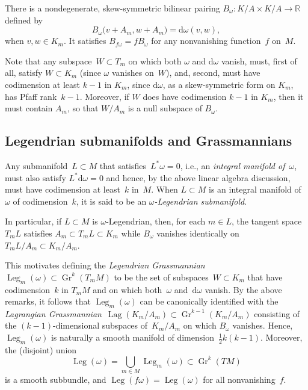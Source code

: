 \documentclass[10pt,a4paper]{amsart}
\renewcommand{\d}{\mathrm{d}}%
\newcommand{\bbR}{{\mathbb R}}
\newcommand{\Gr}{\operatorname{Gr}}
\newcommand{\Leg}{\operatorname{Leg}}
\newcommand{\Lag}{\operatorname{Lag}}
\numberwithin{equation}{section}
\begin{document}
There is a nondegenerate, skew-symmetric bilinear pairing
$B_\omega \colon K{/}A\times K{/}A\to\bbR$
defined by
\[
B_\omega\bigl(v{+}A_m,w{+}A_m\bigr) = \mathrm{d}\omega(v,w),
\]
when $v,w\in K_m$. It satisfies $B_{f\omega} = fB_\omega$
for any nonvanishing function~$f$ on~$M$.

Note that any subspace~$W\subset T_m$ on which both $\omega$ and $\d\omega$
vanish, must, first of all, satisfy $W\subset K_m$
(since $\omega$ vanishes on~$W$), and, second, must have codimension
at least $k{-}1$ in $K_m$, since $\d\omega$, as a skew-symmetric form
on $K_m$, has Pfaff rank~$k{-}1$.
Moreover, if $W$ does have codimension $k{-}1$ in $K_m$,
then it must contain $A_m$, so that $W/A_m$ is a null subspace of $B_\omega$.

\subsection{Legendrian submanifolds and Grassmannians}
Any submanifold~$L\subset M$ that satisfies~$L^*\omega=0$,
i.e., an \emph{integral manifold of~$\omega$},
must also satisfy $L^*\d\omega=0$
and hence, by the above linear algebra discussion,
must have codimension at least~$k$ in~$M$.
When $L\subset M$ is an integral manifold of~$\omega$ of codimension~$k$,
it is said to be an \emph{$\omega$-Legendrian submanifold}.

In particular, if $L\subset M$ is $\omega$-Legendrian,
then, for each $m\in L$, the tangent space $T_mL$
satisfies $A_m\subset T_mL\subset K_m$
while $B_\omega$ vanishes identically on $T_mL/A_m\subset K_m/A_m$.

This motivates defining
the \emph{Legendrian Grassmannian}~$\Leg_m(\omega)\subset\Gr^k(T_mM)$
to be the set of subspaces~$W\subset K_m$
that have codimension~$k$ in $T_mM$
and on which both~$\omega$ and~$\d\omega$ vanish.
By the above remarks, it follows that $\Leg_m(\omega)$
can be canonically identified with the
\emph{Lagrangian Grassmannian}~$\Lag(K_m/A_m)\subset\Gr^{k-1}(K_m/A_m)$
consisting of the $(k{-}1)$-dimensional subspaces of~$K_m/A_m$
on which $B_\omega$ vanishes.
Hence, $\Leg_m(\omega)$ is naturally a smooth manifold
of dimension~$\tfrac12k(k{-}1)$.
Moreover, the (disjoint) union
\[
\Leg(\omega) = \bigcup_{m\in M} \Leg_m(\omega)\subset \Gr^k(TM)
\]
is a smooth subbundle,
and $\Leg(f\omega)=\Leg(\omega)$ for all nonvanishing~$f$.
\end{document}
